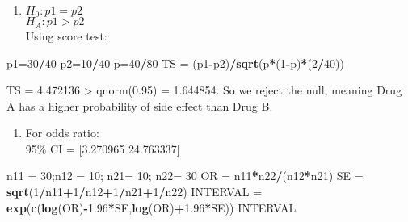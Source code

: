 \documentclass[]{article}
\newenvironment{Shaded}{\begin{snugshade}}{\end{snugshade}}
\newcommand{\KeywordTok}[1]{\textcolor[rgb]{0.13,0.29,0.53}{\textbf{#1}}}
\newcommand{\DecValTok}[1]{\textcolor[rgb]{0.00,0.00,0.81}{#1}}
\newcommand{\FloatTok}[1]{\textcolor[rgb]{0.00,0.00,0.81}{#1}}
\newcommand{\StringTok}[1]{\textcolor[rgb]{0.31,0.60,0.02}{#1}}
\newcommand{\OperatorTok}[1]{\textcolor[rgb]{0.81,0.36,0.00}{\textbf{#1}}}
\newcommand{\NormalTok}[1]{#1}
\providecommand{\tightlist}{%
  \setlength{\itemsep}{0pt}\setlength{\parskip}{0pt}}
\begin{document}
\begin{enumerate}
\def\labelenumi{\alph{enumi}.}
\tightlist
\item
  \(H_0 : p1 = p2\)\\
  \(H_A : p1 > p2\)\\
  Using score test:
\end{enumerate}

\begin{Shaded}
\begin{Highlighting}[]
\NormalTok{p1=}\DecValTok{30}\OperatorTok{/}\DecValTok{40}
\NormalTok{p2=}\DecValTok{10}\OperatorTok{/}\DecValTok{40}
\NormalTok{p=}\DecValTok{40}\OperatorTok{/}\DecValTok{80}
\NormalTok{TS =}\StringTok{ }\NormalTok{(p1}\OperatorTok{-}\NormalTok{p2)}\OperatorTok{/}\KeywordTok{sqrt}\NormalTok{(p}\OperatorTok{*}\NormalTok{(}\DecValTok{1}\OperatorTok{-}\NormalTok{p)}\OperatorTok{*}\NormalTok{(}\DecValTok{2}\OperatorTok{/}\DecValTok{40}\NormalTok{))}
\end{Highlighting}
\end{Shaded}

TS = 4.472136 \textgreater{} qnorm(0.95) = 1.644854. So we reject the
null, meaning Drug A has a higher probability of side effect than Drug
B.

\begin{enumerate}
\def\labelenumi{\alph{enumi}.}
\setcounter{enumi}{1}
\tightlist
\item
  For odds ratio:\\
  95\% CI = {[}3.270965 24.763337{]}
\end{enumerate}

\begin{Shaded}
\begin{Highlighting}[]
\NormalTok{n11 =}\StringTok{ }\DecValTok{30}\NormalTok{;n12 =}\StringTok{ }\DecValTok{10}\NormalTok{; n21=}\StringTok{ }\DecValTok{10}\NormalTok{; n22=}\StringTok{ }\DecValTok{30}
\NormalTok{OR =}\StringTok{ }\NormalTok{n11}\OperatorTok{*}\NormalTok{n22}\OperatorTok{/}\NormalTok{(n12}\OperatorTok{*}\NormalTok{n21)}
\NormalTok{SE =}\StringTok{ }\KeywordTok{sqrt}\NormalTok{(}\DecValTok{1}\OperatorTok{/}\NormalTok{n11}\OperatorTok{+}\DecValTok{1}\OperatorTok{/}\NormalTok{n12}\OperatorTok{+}\DecValTok{1}\OperatorTok{/}\NormalTok{n21}\OperatorTok{+}\DecValTok{1}\OperatorTok{/}\NormalTok{n22)}
\NormalTok{INTERVAL =}\StringTok{ }\KeywordTok{exp}\NormalTok{(}\KeywordTok{c}\NormalTok{(}\KeywordTok{log}\NormalTok{(OR)}\OperatorTok{-}\FloatTok{1.96}\OperatorTok{*}\NormalTok{SE,}\KeywordTok{log}\NormalTok{(OR)}\OperatorTok{+}\FloatTok{1.96}\OperatorTok{*}\NormalTok{SE))}
\NormalTok{INTERVAL}
\end{Highlighting}
\end{Shaded}
\end{document}
